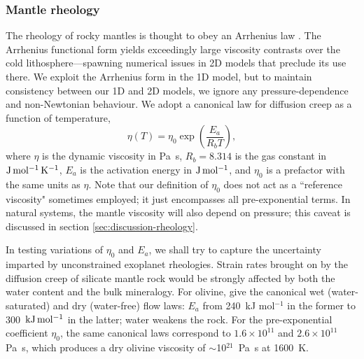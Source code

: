 \subsubsection{Mantle rheology}\label{sec:viscosity-model}

The rheology of rocky mantles is thought to obey an Arrhenius law \citep{karato_rheology_1993}. The Arrhenius functional form yields exceedingly large viscosity contrasts over the cold lithosphere---spawning numerical issues in 2D models that preclude its use there. We exploit the Arrhenius form in the 1D model, but to maintain consistency between our 1D and 2D models, we ignore any pressure-dependence and non-Newtonian behaviour. We adopt a canonical law for diffusion creep as a function of temperature,
\begin{equation}
    \label{eq:eta-arrhenius}
\eta(T) = \eta_0 \exp\left(\frac{E_a}{R_b T}\right),
\end{equation}
where $\eta$ is the dynamic viscosity in Pa~s, $R_b = 8.314$ is the gas constant in $\rm{J\,mol^{-1}\,K^{-1}}$, $E_a$ is the activation energy in $\rm{J\,mol^{-1}}$, and $\eta_0$ is a prefactor with the same units as $\eta$. Note that our definition of $\eta_0$ does not act as a ``reference viscosity" sometimes employed; it just encompasses all pre-exponential terms. In natural systems, the mantle viscosity will also depend on pressure; this caveat is discussed in section \ref{sec:discussion-rheology}.

In testing variations of $\eta_0$ and $E_a$, we shall try to capture the uncertainty imparted by unconstrained exoplanet rheologies. Strain rates brought on by the diffusion creep of silicate mantle rock would be strongly affected by both the water content and the bulk mineralogy. For olivine, \citet{karato_rheology_1993} give the canonical wet (water-saturated) and dry (water-free) flow laws: $E_a$ from 240~kJ mol$^{-1}$ in the former to 300~$\rm{kJ\,mol^{-1}}$ in the latter; water weakens the rock. For the pre-exponential coefficient $\eta_0$, the same canonical laws correspond to $1.6 \times 10^{11}$ and $2.6 \times 10^{11}$ Pa~s, which produces a dry olivine viscosity of $\sim$10$^{21}$~Pa~s at 1600~K. %

